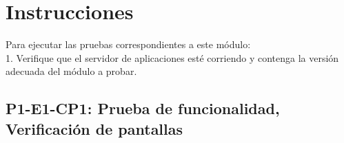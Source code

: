 \documentclass[oneside,10pt]{book}
\begin{document}
\section{Instrucciones}

Para ejecutar las pruebas correspondientes a este módulo: \\

1. Verifique que el servidor de aplicaciones esté corriendo y contenga la versión adecuada del módulo a probar. \\

\newpage
\subsection{P1-E1-CP1: Prueba de funcionalidad, Verificación de pantallas}
\end{document}
